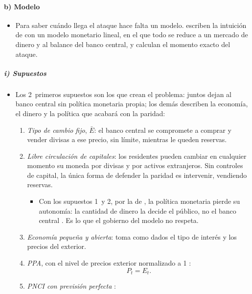 \documentclass[11pt]{article}
\begin{document}
\paragraph{b) Modelo}

\begin{itemize}
\item Para saber cuándo llega el ataque hace falta un modelo. \textcite{FloodGarber1984} escriben la intuición de \textcite{Krugman1979Model} con un modelo monetario lineal, en el que todo se reduce a un mercado de dinero y al balance del banco central, y calculan el momento exacto del ataque.
\end{itemize}

\subparagraph{i) Supuestos}

\begin{itemize}
\item Los 2~primeros supuestos son los que crean el problema: juntos dejan al banco central sin política monetaria propia; los demás describen la economía, el dinero y la política que acabará con la paridad:
  \begin{enumerate}
  \item \emph{Tipo de cambio fijo}, $\bar E$: el banco central se compromete a comprar y vender divisas a ese precio, sin límite, mientras le queden reservas.
  \item \emph{Libre circulación de capitales}: los residentes pueden cambiar en cualquier momento su moneda por divisas y por activos extranjeros. Sin controles de capital, la única forma de defender la paridad es intervenir, vendiendo reservas.
    \begin{itemize}
    \item Con los supuestos 1~y 2, por la  de , la política monetaria pierde su autonomía: la cantidad de dinero la decide el público, no el banco central . Es lo que el gobierno del modelo no respeta.
    \end{itemize}
  \item \emph{Economía pequeña y abierta}: toma como dados el tipo de interés y los precios del exterior.
  \item \emph{PPA}, con el nivel de precios exterior normalizado a 1 :
    \begin{equation}\label{eq:ppa-fg}
    P_t=E_t .
    \end{equation}
  \item \emph{PNCI con previsión perfecta} :
    \begin{equation}\label{eq:pnci-fg}

\end{equation}
\end{enumerate}
\end{itemize}
\end{document}
